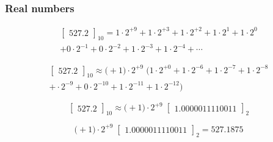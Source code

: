 \begin{frame}
  \frametitle{Real numbers}

\begin{multline*}
\begin{bmatrix}527.2\end{bmatrix}_{10} = 1\cdot 2^{+9} + 1\cdot 2^{+3} + 1\cdot 2^{+2} + 1\cdot 2^{1} + 1\cdot 2^{0}  \\+ 0\cdot 2^{-1} + 0\cdot 2^{-2} + 1\cdot 2^{-3}+ 1\cdot 2^{-4} + \cdots
\end{multline*}

\begin{multline*}
\begin{bmatrix}527.2\end{bmatrix}_{10} \approx \bigl(+1\bigr)\cdot 2^{+9}\;\bigl(1\cdot 2^{+0} + 1\cdot 2^{-6} + 1\cdot 2^{-7} + 1\cdot 2^{-8} \\
+ \cdot 2^{-9} + 0\cdot 2^{-10} + 1\cdot 2^{-11}+ 1\cdot 2^{-12}\bigr)
\end{multline*}

\begin{equation*}
\begin{bmatrix}527.2\end{bmatrix}_{10} \approx \bigl(+1\bigr)\cdot 2^{+9}\;\begin{bmatrix}1.0000011110011\end{bmatrix}_{2}
\end{equation*}

\begin{equation*}
\bigl(+1\bigr)\cdot 2^{+9}\;\begin{bmatrix}1.0000011110011\end{bmatrix}_{2} = 527.1875
\end{equation*}

\end{frame}


